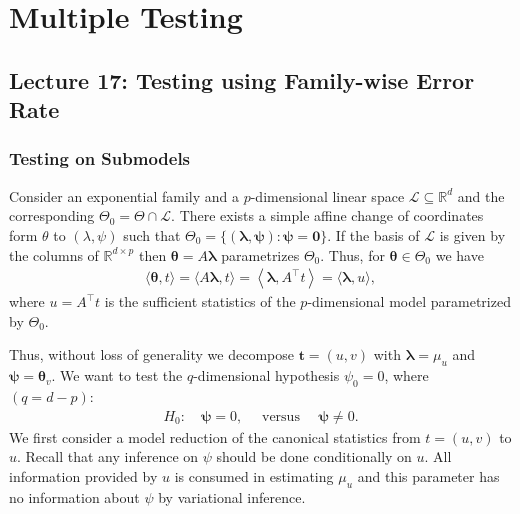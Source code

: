 \chapter{Multiple Testing}
\section{Lecture 17: Testing using Family-wise Error Rate }
\subsection{Testing on Submodels}
Consider an exponential family and a $p$-dimensional linear space $\mathcal{L} \subseteq \mathbb{R}^d$ and the corresponding $\Theta_0=\Theta \cap \mathcal{L}$. There exists a simple affine change of coordinates form $\theta$ to $(\lambda, \psi)$ such that $\Theta_0=\{(\boldsymbol{\lambda}, \boldsymbol{\psi}): \boldsymbol{\psi}=\mathbf{0}\}$. If the basis of $\mathcal{L}$ is given by the columns of $\mathbb{R}^{d \times p}$ then $\boldsymbol{\theta}=A \boldsymbol{\lambda}$ parametrizes $\Theta_0$. Thus, for $\boldsymbol{\theta} \in \Theta_0$ we have
\begin{align*}
\langle\boldsymbol{\theta}, t\rangle=\langle A \boldsymbol{\lambda}, t\rangle=\left\langle\boldsymbol{\lambda}, A^{\top} t\right\rangle=\langle\boldsymbol{\lambda}, u\rangle,
\end{align*}
where $u=A^{\top} t$ is the sufficient statistics of the $p$-dimensional model parametrized by $\Theta_0$.

Thus, without loss of generality we decompose $\mathbf{t}=(u, v)$ with $\boldsymbol\lambda=\mu_u$ and $\boldsymbol{\psi}=\boldsymbol{\theta}_v$. We want to test the $q$-dimensional hypothesis $\psi_0=0$, where $(q=d-p)$:
\begin{align*}
H_0: \quad \boldsymbol{\psi}=0, \quad \text { versus } \quad \boldsymbol{\psi} \neq 0 .
\end{align*}
We first consider a model reduction of the canonical statistics from $t=(u, v)$ to $u$. Recall that any inference on $\psi$ should be done conditionally on $u$. All information provided by $u$ is consumed in estimating $\mu_u$ and this parameter has no information about $\psi$ by variational inference.

